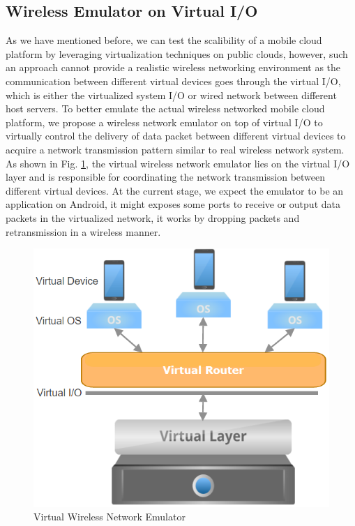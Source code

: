 \documentclass[journal,comsoc]{IEEEtran}
\begin{document}
\subsection{Wireless Emulator on Virtual I/O}
As we have mentioned before, we can test the scalibility of a mobile cloud platform by leveraging virtualization techniques on public clouds, however, such an approach cannot provide a realistic wireless networking environment as the communication between different virtual devices goes through the virtual I/O, which is either the virtualized system I/O or wired network between different host servers. To better emulate the actual wireless networked mobile cloud platform, we propose a wireless network emulator on top of virtual I/O to virtually control the delivery of data packet between different virtual devices to acquire a network transmission pattern similar to real wireless network system. As shown in Fig. \ref{virtual_router}, the virtual wireless network emulator lies on the virtual I/O layer and is responsible for coordinating the network transmission between different virtual devices. At the current stage, we expect the emulator to be an application on Android, it might exposes some ports to receive or output data packets in the virtualized network, it works by dropping packets and retransmission in a wireless manner. 
\begin{figure}[htbp]
\begin{center}
\includegraphics[width=0.8\linewidth]{virtual_router.png} 
\end{center}	   
\caption{Virtual Wireless Network Emulator}\label{virtual_router}
\end{figure}
\end{document}
